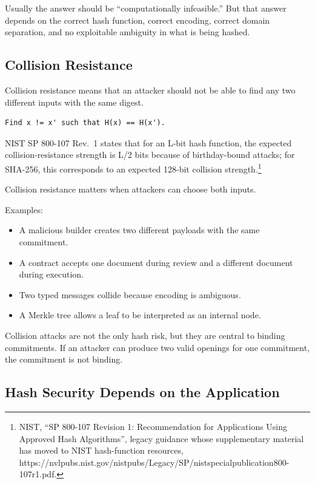Usually the answer should be ``computationally infeasible.'' But that
answer depends on the correct hash function, correct encoding, correct
domain separation, and no exploitable ambiguity in what is being hashed.

\subsection{Collision Resistance}

Collision resistance means that an attacker should not be able to find
any two different inputs with the same digest.

\begin{lstlisting}
Find x != x' such that H(x) == H(x').
\end{lstlisting}

NIST SP 800-107 Rev.~1 states that for an L-bit hash function, the
expected collision-resistance strength is L/2 bits because of
birthday-bound attacks; for SHA-256, this corresponds to an expected
128-bit collision strength.\footnote{NIST, ``SP 800-107 Revision 1:
  Recommendation for Applications Using Approved Hash Algorithms'',
  legacy guidance whose supplementary material has moved to NIST
  hash-function resources,
  https://nvlpubs.nist.gov/nistpubs/Legacy/SP/nistspecialpublication800-107r1.pdf.}

Collision resistance matters when attackers can choose both inputs.

Examples:

\begin{itemize}
\tightlist
\item
  A malicious builder creates two different payloads with the same
  commitment.
\item
  A contract accepts one document during review and a different document
  during execution.
\item
  Two typed messages collide because encoding is ambiguous.
\item
  A Merkle tree allows a leaf to be interpreted as an internal node.
\end{itemize}

Collision attacks are not the only hash risk, but they are central to
binding commitments. If an attacker can produce two valid openings for
one commitment, the commitment is not binding.

\subsection{Hash Security Depends on the Application}

